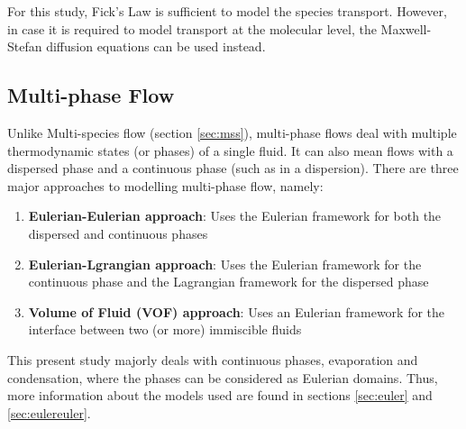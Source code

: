\documentclass[11pt,a4paper,twoside,oneside]{article}
\begin{document}
For this study, Fick's Law is sufficient to model the species transport. However, in case it is required to model transport at the molecular level, the Maxwell-Stefan diffusion equations can be used instead\cite{multitransport}.


\subsection{Multi-phase Flow}\label{sec:mpflow}
\vspace{.3cm}
Unlike Multi-species flow (section \ref{sec:mss}), multi-phase flows deal with multiple thermodynamic states (or phases) of a single fluid. It can also mean flows with a dispersed phase and a continuous phase (such as in a dispersion)\cite{brennanmultiphase}. There are three major approaches to modelling multi-phase flow\cite{batchelor_2013}, namely:
\begin{enumerate}
    \item \textbf{Eulerian-Eulerian approach}:  Uses the Eulerian framework for both the dispersed and continuous phases
    \item \textbf{Eulerian-Lgrangian approach}: Uses the Eulerian framework for the continuous phase and the Lagrangian framework for the dispersed phase
    \item \textbf{Volume of Fluid (VOF) approach}: Uses an Eulerian framework for the interface between two (or more) immiscible fluids
\end{enumerate}
This present study majorly deals with continuous phases, evaporation and condensation, where the phases can be considered as Eulerian domains. Thus, more information about the models used are found in sections \ref{sec:euler} and \ref{sec:eulereuler}.
\end{document}
